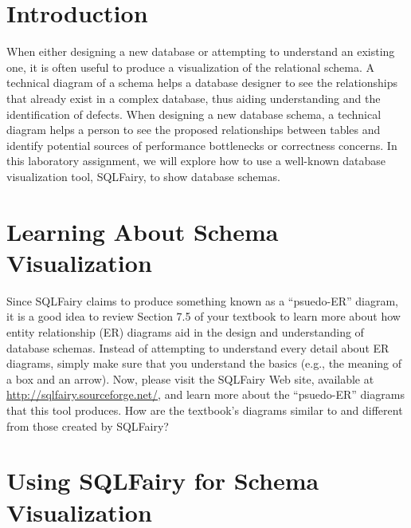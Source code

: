 


\usepackage[compact]{titlesec}



\section*{Introduction}

When either designing a new database or attempting to understand an existing one, it is often useful to produce a
visualization of the relational schema.  A technical diagram of a schema helps a database designer to see the
relationships that already exist in a complex database, thus aiding understanding and the identification of defects.
When designing a new database schema, a technical diagram helps a person to see the proposed relationships between
tables and identify potential sources of performance bottlenecks or correctness concerns. In this laboratory assignment,
we will explore how to use a well-known database visualization tool, SQLFairy, to show database schemas.

\vspace*{-.05in}
\section*{Learning About Schema Visualization}

Since SQLFairy claims to produce something known as a ``psuedo-ER'' diagram, it is a good idea to review Section 7.5 of
your textbook to learn more about how entity relationship (ER) diagrams aid in the design and understanding of database
schemas. Instead of attempting to understand every detail about ER diagrams, simply make sure that you understand 
the basics (e.g., the meaning of a box and an arrow). Now, please visit the SQLFairy Web site, available at
\url{http://sqlfairy.sourceforge.net/}, and learn more about the ``psuedo-ER'' diagrams that this tool produces. How are
the textbook's diagrams similar to and different from those created by SQLFairy?

\vspace*{-.05in}
\section*{Using SQLFairy for Schema Visualization}


